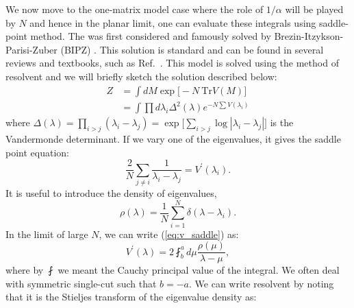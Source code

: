 \documentclass[11pt]{article}
\begin{document}
We now move to the one-matrix model case where the role of $1/\alpha$ will be played by $N$ and hence in the planar limit, one can evaluate these integrals using saddle-point method. The was first considered and famously solved by Brezin-Itzykson-Parisi-Zuber (BIPZ) \cite{Brezin:1977sv}. This solution is standard and can be found in several reviews and textbooks, such as Ref.~\cite{DiFrancesco:1993cyw, Marino:2004eq, 2002mcgt.book.....M}. This model is solved using the method of resolvent
and we will briefly sketch the solution described below:
\begin{align}
	Z &= \int dM \exp\Big[-N~\mbox{Tr} V(M)\Big] \\
	& = \int \prod d\lambda_{i} \Delta^2(\lambda)  e^{-N \sum V(\lambda_i)} 
\end{align}
where $\Delta(\lambda) = \prod_{i > j} (\lambda_i - \lambda_j) = \exp\Big[\sum_{i>j} \log |\lambda_{i} - \lambda_{j}|\Big]$ is the Vandermonde 
determinant. If we vary one of the eigenvalues, it gives the saddle point equation:
\begin{equation}
	\label{eq:v_saddle}
	\frac{2}{N} \sum_{j \neq i} \frac{1}{\lambda_i - \lambda_j} = V^{\prime}(\lambda_i).
\end{equation}
It is useful to introduce the density of eigenvalues,
\begin{equation}
	\rho(\lambda) = \frac{1}{N} \sum_{i=1}^{N} \delta(\lambda - \lambda_i). 
\end{equation}
In the limit of large $N$, we can write (\ref{eq:v_saddle})
as:
\begin{equation}
	\label{eq:vprime}
	V^{\prime}(\lambda) = 2 \fint_{b}^{a} d\mu \frac{\rho(\mu)}{\lambda - \mu}, 
\end{equation}
where by $\fint$ we meant the Cauchy principal value of the integral. We 
often deal with symmetric single-cut such that $b=-a$. 
We can write resolvent by noting that it is the Stieljes transform of the eigenvalue density as: 
\end{document}
